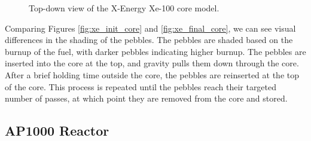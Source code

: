 \begin{figure}[H]
    \hfill
    \caption{Top-down view of the X-Energy Xe-100 core model.}
    \label{fig:xe_core}
  \end{figure}

Comparing Figures \ref{fig:xe_init_core} and \ref{fig:xe_final_core}, we can see visual differences in the shading of the pebbles. The pebbles are shaded based on the burnup of the fuel, with darker pebbles indicating higher burnup. The pebbles are inserted into the core at the top, and gravity pulls them down through the core. After a brief holding time outside the core, the pebbles are reinserted at the top of the core. This process is repeated until the pebbles reach their targeted number of passes, at which point they are removed from the core and stored.

\subsection{AP1000 Reactor}
\label{sec:ap}

